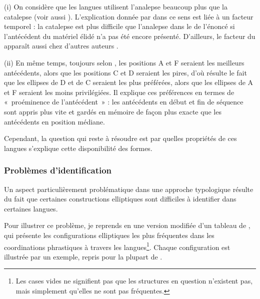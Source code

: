 (i) On considère que les langues utilisent l’analepse beaucoup plus que la cata\-lepse (voir aussi \citealt{Haspelmath2007}). L’explication donnée par \citet{Sanders1977} dans ce sens est liée à un facteur temporel : la catalepse est plus difficile que l’analepse dans le  de l’énoncé si l’antécédent du matériel élidé n’a pas été encore présenté. D’ailleurs, le facteur du  apparaît aussi chez d’autres auteurs \citep{Ramat1987,Hawkins1988,GaetaEtAl2001}. 

(ii) En même temps, toujours selon \citet{Sanders1977}, les positions A et F seraient les meilleurs antécédents, alors que les positions C et D seraient les pires, d’où résulte le fait que les ellipses de D et de C seraient les plus préférées, alors que les ellipses de A et F seraient les moins privilégiées. Il explique ces préférences en termes de «~proéminence de l’antécédent~» : les antécédents en début et fin de séquence sont appris plus vite et gardés en mémoire de façon plus exacte que les antécédents en position médiane. 

Cependant, la question qui reste à résoudre est par quelles propriétés de ces langues s’explique cette disponibilité des formes.

\subsubsection{Problèmes d’identification} \label{ch1:sect1.4.4.2}

Un aspect particulièrement problématique dans une approche typologique résulte du fait que certaines constructions elliptiques sont difficiles à identifier dans certaines langues.

Pour illustrer ce problème, je reprends en  une version modifiée d’un tableau de \citet{Haspelmath2007}, qui présente les configurations elliptiques les plus fréquentes dans les coordinations phrastiques à travers les langues\footnote{Les cases vides ne signifient pas que les structures en question n’existent pas, mais simplement qu’elles ne sont pas fréquentes.}. Chaque configuration est illustrée par un exemple, repris pour la plupart de \citet{Haspelmath2007}.

